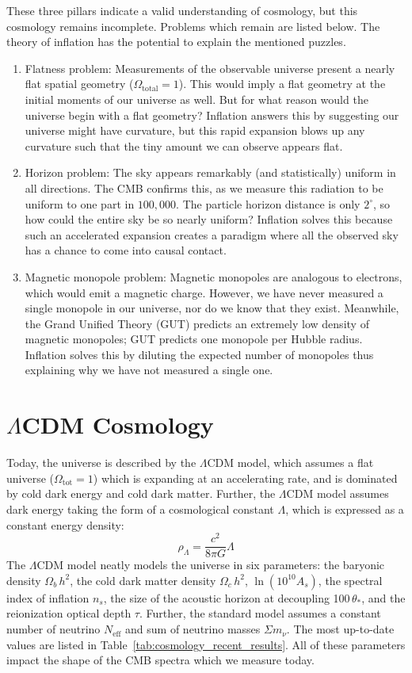 These three pillars indicate a valid understanding of cosmology, but this cosmology remains incomplete.  Problems which remain are listed below.  The theory of inflation has the potential to explain the mentioned puzzles.

\begin{enumerate}
    \item Flatness problem:  Measurements of the observable universe present a nearly flat spatial geometry ($\Omega_{\text{total}}=1$).  This would imply a flat geometry at the initial moments of our universe as well.  But for what reason would the universe begin with a flat geometry?  Inflation answers this by suggesting our universe might have curvature, but this rapid expansion blows up any curvature such that the tiny amount we can observe appears flat. 
    \item Horizon problem:  The sky appears remarkably (and statistically) uniform in all directions.  The CMB confirms this, as we measure this radiation to be uniform to one part in $100,000$.  The particle horizon distance is only $2^{\circ}$, so how could the entire sky be so nearly uniform?  Inflation solves this because such an accelerated expansion creates a paradigm where all the observed sky has a chance to come into causal contact.
    \item Magnetic monopole problem:  Magnetic monopoles are analogous to electrons, which would emit a magnetic charge.  However, we have never measured a single monopole in our universe, nor do we know that they exist.  Meanwhile, the Grand Unified Theory (GUT) predicts an extremely low density of magnetic monopoles; GUT predicts one monopole per Hubble radius.  Inflation solves this by diluting the expected number of monopoles thus explaining why we have not measured a single one.
\end{enumerate}
\section{$\Lambda$CDM Cosmology}
Today, the universe is described by the $\Lambda$CDM model, which assumes a flat universe ($\Omega_{\text{tot}}=1$) which is expanding at an accelerating rate, and is dominated by cold dark energy and cold dark matter.  Further, the $\Lambda$CDM model assumes dark energy taking the form of a cosmological constant $\Lambda$, which is expressed as a constant energy density:
\begin{equation}
    \rho_\Lambda = \frac{c^2}{8\pi G}\Lambda 
\end{equation}
The $\Lambda$CDM model neatly models the universe in six parameters: the baryonic density $\Omega_b\,h^2$, the cold dark matter density $\Omega_c\,h^2$, $\ln(10^{10}A_s)$, the spectral index of inflation $n_s$, the size of the acoustic horizon at decoupling 100\,$\theta_{*}$, and the reionization optical depth $\tau$.  Further, the standard model assumes a constant number of neutrino $N_{\text{eff}}$ and sum of neutrino masses $\Sigma m_\nu$. The most up-to-date values are listed in Table~\ref{tab:cosmology_recent_results}.  All of these parameters impact the shape of the CMB spectra which we measure today.

